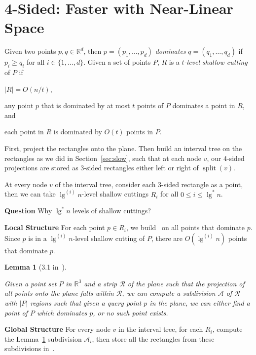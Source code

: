 \documentclass[letterpaper,12pt,twocolumn]{article}
\newcommand\lspace{\hspace{-0.5em}}
\DeclareMathOperator{\splt}{split}
\newcommand{\BigOh}[1]{O\!\left(#1\right)}
\newcommand\IR{\mathbb{R}}
\theoremstyle{plain}
\newtheorem{lemma}{Lemma}
\begin{document}
\section{\lspace{} 4-Sided: Faster with Near-Linear Space}
\label{sec:4sided}

Given two points $p,q \in \IR^d$, then $p = (p_1, \ldots, p_d)$
\emph{dominates} $q = (q_1, \ldots, q_d)$ if $p_i \ge q_i$ for all $i
\in \{1, \ldots, d \}$.  Given a set of points $P$, $R$ is a
\emph{$t$-level shallow cutting} of $P$ if
%
\begin{enumerate*}[label=(\roman*)] %
\item $|R| = \BigOh{n/t}$,
\item any point $p$ that is dominated by at most $t$ points of $P$
  dominates a point in $R$, and
\item each point in $R$ is dominated by $\BigOh{t}$ points in $P$.
\end{enumerate*}

First, project the rectangles onto the plane.  Then build an interval
tree on the rectangles as we did in Section~\ref{sec:slow}, such that
at each node $v$, our 4-sided projections are stored as 3-sided
rectangles either left or right of $\splt(v)$.

At every node $v$ of the interval tree, consider each 3-sided
rectangle as a point, then we can take $\lg^{(i)} n$-level shallow
cuttings $R_i$ for all $0 \le i \le \lg^* n$.

\textbf{Question} Why $\lg^* n$ levels of shallow cuttings?

\textbf{Local Structure} For each point $p \in R_i$, we
build~\cite{afshani2008dominance} on all points that dominate $p$.
Since $p$ is in a $\lg^{(i)} n$-level shallow cutting of $P$, there
are $\BigOh{\lg^{(i)} n}$ points that dominate $p$.

\begin{lemma}[3.1 in~\cite{saladi2015improved}]\label{lem:31}

  Given a point set $P$ in $\IR^3$ and a strip $\mathcal{R}$ of the
  plane such that the projection of all points onto the plane falls
  within $\mathcal{R}$, we can compute a subdivision $\mathcal{A}$ of
  $\mathcal{R}$ with $|P|$ regions such that given a query point $p$
  in the plane, we can either find a point of $P$ which dominates $p$,
  or no such point exists.

\end{lemma}

\textbf{Global Structure} For every node $v$ in the interval tree, for
each $R_i$, compute the Lemma~\ref{lem:31} subdivision
$\mathcal{A}_i$, then store all the rectangles from these subdivisions
in~\cite{chazelle1986filtering}.
\end{document}
